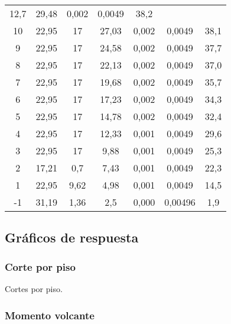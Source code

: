 \begin{table}[H]
{\begin{tabular}{ccccccc}
      12,7 &
      29,48 &
      0,002 &
      0,0049 &
      38,2
      \\
    10 &
      22,95 &
      17 &
      27,03 &
      0,002 &
      0,0049 &
      38,1
      \\
    9 &
      22,95 &
      17 &
      24,58 &
      0,002 &
      0,0049 &
      37,7
      \\
    8 &
      22,95 &
      17 &
      22,13 &
      0,002 &
      0,0049 &
      37,0
      \\
    7 &
      22,95 &
      17 &
      19,68 &
      0,002 &
      0,0049 &
      35,7
      \\
    6 &
      22,95 &
      17 &
      17,23 &
      0,002 &
      0,0049 &
      34,3
      \\
    5 &
      22,95 &
      17 &
      14,78 &
      0,002 &
      0,0049 &
      32,4
      \\
    4 &
      22,95 &
      17 &
      12,33 &
      0,001 &
      0,0049 &
      29,6
      \\
    3 &
      22,95 &
      17 &
      9,88 &
      0,001 &
      0,0049 &
      25,3
      \\
    2 &
      17,21 &
      0,7 &
      7,43 &
      0,001 &
      0,0049 &
      22,3
      \\
    1 &
      22,95 &
      9,62 &
      4,98 &
      0,001 &
      0,0049 &
      14,5
      \\
    -1 &
      31,19 &
      1,36 &
      2,5 &
      0,000 &
      0,00496 &
      1,9
      \bigstrut[b]\\
    \hline
  \end{tabular}}
  \label{syDD}
\end{table}

\newpage
\subsection{Gráficos de respuesta}

\subsubsection{Corte por piso}

\begin{images}[\label{corte-piso}]{Cortes por piso.}
\end{images}

\subsubsection{Momento volcante}

